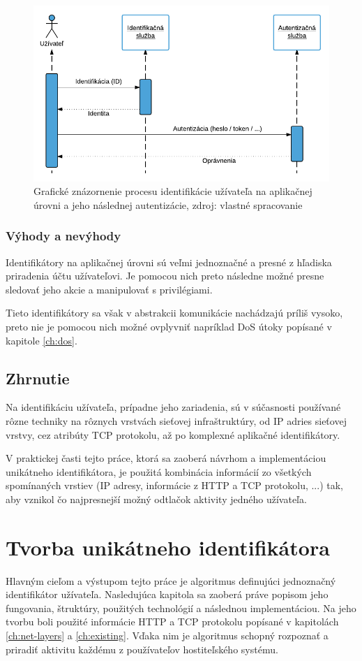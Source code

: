 \documentclass[
  digital, %
  table,   %
  lof,     %
  nolot,   %
  nocover
]{fithesis3}
\begin{document}
\begin{figure}[h]
  \centering
    \includegraphics[width=.99\textwidth]{images/tech-app.png}
  \caption{Grafické znázornenie procesu identifikácie užívateľa na aplikačnej
  úrovni a jeho následnej autentizácie, zdroj: vlastné spracovanie}
  \label{fig:tech-app}
\end{figure}

\subsection{Výhody a nevýhody}
Identifikátory na aplikačnej úrovni sú veľmi jednoznačné a presné z hľadiska
priradenia účtu užívateľovi. Je pomocou nich preto následne možné presne
sledovať jeho akcie a manipulovať s privilégiami.

Tieto identifikátory sa však v abstrakcii komunikácie nachádzajú príliš vysoko,
preto nie je pomocou nich možné ovplyvniť napríklad DoS útoky popísané v
kapitole \ref{ch:dos}.

\section{Zhrnutie}
Na identifikáciu užívateľa, prípadne jeho zariadenia, sú v súčasnosti
používané rôzne techniky na rôznych vrstvách sieťovej infraštruktúry, od IP
adries sieťovej vrstvy, cez atribúty TCP protokolu, až po komplexné aplikačné
identifikátory. 

V praktickej časti tejto práce, ktorá sa zaoberá návrhom a implementáciou
unikátneho identifikátora, je použitá kombinácia informácií zo všetkých
spomínaných vrstiev (IP adresy, informácie z HTTP a TCP protokolu, ...) tak,
aby vznikol čo najpresnejší možný odtlačok aktivity jedného užívateľa.

\chapter{Tvorba unikátneho identifikátora}
\label{ch:footprint}
Hlavným cieľom a výstupom tejto práce je algoritmus definujúci jednoznačný
identifikátor užívateľa. Nasledujúca kapitola sa zaoberá práve popisom jeho
fungovania, štruktúry, použitých technológií a následnou implementáciou. Na
jeho tvorbu boli použité informácie HTTP a TCP protokolu popísané v
kapitolách \ref{ch:net-layers} a \ref{ch:existing}. Vďaka nim je algoritmus
schopný rozpoznať a priradiť aktivitu každému z používateľov hostiteľského
systému.
\end{document}
